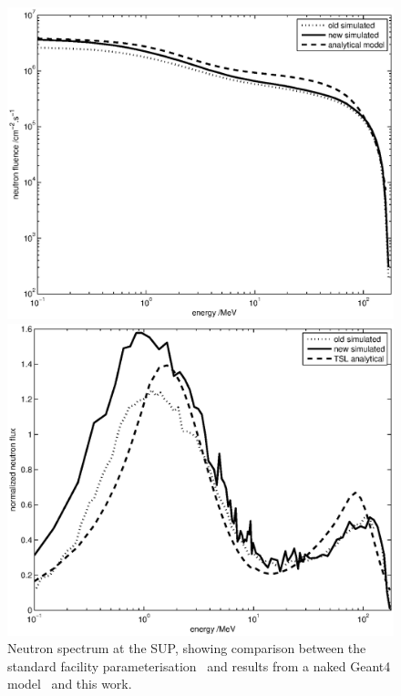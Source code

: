 \documentclass[11pt,a4paper]{IEEEtran}
\let\MYoriglatexcaption\caption
\renewcommand{\caption}[2][\relax]{\MYoriglatexcaption[#2]{#2}}
\begin{document}
\begin{figure}[t]
    \begin{minipage}{\columnwidth}
        \centering
        \includegraphics[width=0.9\columnwidth]{SUPComparedIFluxRADECS.eps}
    \end{minipage}
    \begin{minipage}{\columnwidth}
        \centering
        \includegraphics[width=0.9\columnwidth]{SUPNormalisedRADECS.eps}
    \end{minipage}
	\caption{
        Neutron spectrum at the SUP, showing comparison between the standard facility parameterisation~\cite{Prokofiev2009} and results from a naked Geant4 model~\cite{Platt13} and this work.
    }
	\label{fig:SUPSpectraComparison}
\end{figure}
\end{document}
